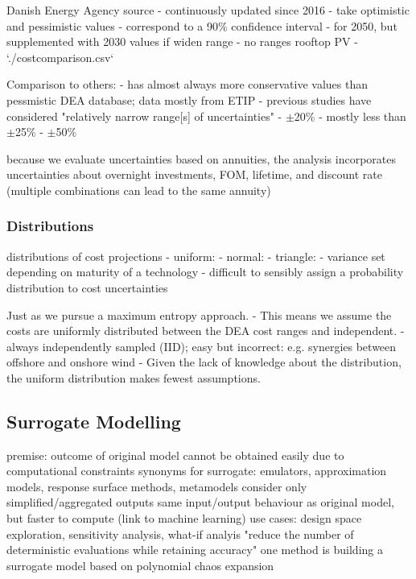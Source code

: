 Danish Energy Agency source
- continuously updated since 2016
- take optimistic and pessimistic values
- correspond to a 90\% confidence interval
- for 2050, but supplemented with 2030 values if widen range
- no ranges rooftop PV
- `./costcomparison.csv`

Comparison to others:
- \cite{trondle_trade-offs_2020} has almost always more conservative values than pessmistic DEA database; data mostly from ETIP
- previous studies have considered "relatively narrow range[s] of uncertainties" \cite{Li2017}
- $\pm$20\% \cite{moret_characterization_2017}
- mostly less than $\pm$25\% \cite{pizarro-alonso_uncertainties_2019}
- $\pm$50\% \cite{shirizadeh_how_2019}

because we evaluate uncertainties based on annuities,
the analysis incorporates uncertainties about
overnight investments, FOM, lifetime, and discount rate
(multiple combinations can lead to the same annuity)

\subsubsection{Distributions}

distributions of cost projections
- uniform: \cite{moret_characterization_2017,moret_robust_2016,shirizadeh_how_2019,trondle_trade-offs_2020,pilpola_analyzing_2020,Li2017,Trutnevyte2013,lopion_cost_2019}
- normal: \cite{mavromatidis_uncertainty_2018}
- triangle: \cite{li_using_2020}
- variance set depending on maturity of a technology \cite{li_using_2020}
- difficult to sensibly assign a probability distribution to cost uncertainties \cite{moret_robust_2016}

Just as \cite{trondle_trade-offs_2020} we pursue a maximum entropy approach. 
- This means we assume the costs are uniformly distributed between the DEA cost ranges and independent.
- always independently sampled (IID); easy but incorrect: e.g. synergies between offshore and onshore wind
- Given the lack of knowledge about the distribution, the uniform distribution makes fewest assumptions.

\subsection{Surrogate Modelling}
\label{sec:surrogate}

premise: outcome of original model cannot be obtained easily due to computational constraints
synonyms for surrogate: emulators, approximation models, response surface methods, metamodels
consider only simplified/aggregated outputs
same input/output behaviour as original model, but faster to compute (link to machine learning)
use cases: design space exploration, sensitivity analysis, what-if analyis
"reduce the number of deterministic evaluations while retaining accuracy" \cite{palar_multi-fidelity_2016}
one method is building a surrogate model based on polynomial chaos expansion


